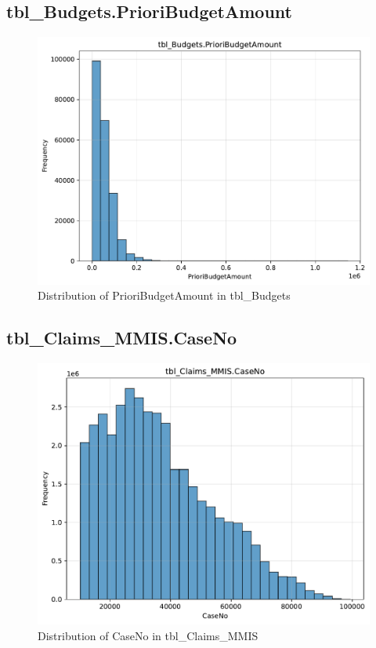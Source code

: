 \subsection{tbl\_Budgets.PrioriBudgetAmount}

\begin{figure}[htbp]
\centering
\includegraphics[width=\textwidth]{figures/dbo_tbl_Budgets_PrioriBudgetAmount.pdf}
\caption{Distribution of PrioriBudgetAmount in tbl\_Budgets}
\end{figure}\newpage

\subsection{tbl\_Claims\_MMIS.CaseNo}

\begin{figure}[htbp]
\centering
\includegraphics[width=\textwidth]{figures/dbo_tbl_Claims_MMIS_CaseNo.pdf}
\caption{Distribution of CaseNo in tbl\_Claims\_MMIS}
\end{figure}\newpage

